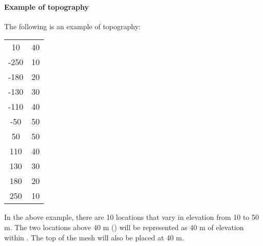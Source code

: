 \paragraph{Example of topography} 

The following is an example of topography:

\begin{fileExample}
\begin{tabular}{|cc|}
\hline
10 & 40 \\
-250 & 10 \\
-180 & 20 \\
-130 & 30 \\
-110 & 40 \\
-50 & 50 \\
50  & 50 \\
110 & 40 \\
130 & 30 \\
180 & 20 \\
250 & 10 \\
\hline
\end{tabular}
\end{fileExample}

In the above example, there are 10 locations that vary in elevation from 10 to 50 m. The two locations above 40 m () will be represented as 40 m of elevation within . The top of the mesh will also be placed at 40 m.